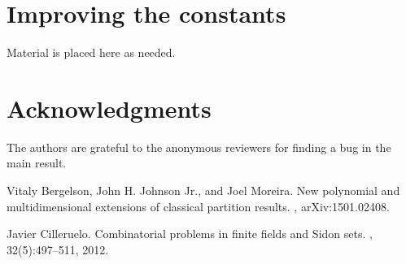 \documentclass{aic}
\begin{document}
\section{Improving the constants}
Material is placed here as needed.

\section*{Acknowledgments} %
The authors are grateful to the anonymous reviewers for finding
a bug in the main result.


\begin{thebibliography}{99}
Vitaly Bergelson, John H. Johnson Jr., and Joel Moreira.
\newblock New polynomial and multidimensional extensions of classical partition
  results.
, arXiv:1501.02408.

Javier Cilleruelo.
\newblock Combinatorial problems in finite fields and {S}idon sets.
, 32(5):497--511, 2012.

\end{thebibliography}
\end{document}
